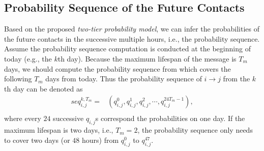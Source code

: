 \subsection{Probability Sequence of the Future Contacts}
\label{subsec:seq}
Based on the proposed {\it two-tier probability model},
we can infer the probabilities of the future contacts
in the successive multiple hours,
i.e., the probability sequence.
Assume the probability sequence computation is conducted
at the beginning of today (e.g., the $k$th day).
Because the maximum lifespan of the message is $T_m$ days,
we should compute the probability sequence from
which covers the following $T_m$ days from today.
Thus the probability sequence of $i \rightarrow j$ from the $k$th day
can be denoted as
\begin{equation}
\label{eq:prob_seq}
\begin{aligned}
seq_{i,j}^{k,T_m}
= &(q_{i,j}^{0}, q_{i,j}^{1}, q_{i,j}^{2}, \cdots, q_{i,j}^{24T_m -1}),\\
\end{aligned}
\end{equation}
where every $24$ successive $q_{i,j}$s correspond the probabilities on one day.
If the maximum lifespan is two days, i.e., $T_m=2$,
the probability sequence only needs to cover two days (or $48$ hours)
from $q_{i,j}^{0}$ to $q_{i,j}^{47}$.

